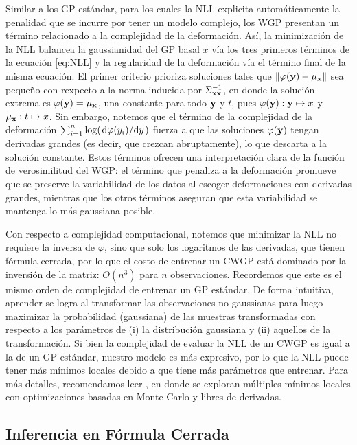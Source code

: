 Similar a los GP estándar, para los cuales la NLL explicita automáticamente la penalidad que se incurre por tener un modelo complejo, los WGP presentan un término relacionado a la complejidad de la deformación. Así, la minimización de la NLL balancea la gaussianidad del GP basal \(x\) vía los tres primeros términos de la ecuación \eqref{eq:NLL} y la regularidad de la deformación vía el término final de la misma ecuación. El primer criterio prioriza soluciones tales que \(\lVert \varphi(\mathbf{y}) - \mu_{\mathbf{x}} \rVert\) sea pequeño con rexpecto a la norma inducida por \(\Sigma_{\mathbf{x} \mathbf{x}}^{-1}\), en donde la solución extrema es \(\varphi(\mathbf{y}) = \mu_{\mathbf{x}}\), una constante para todo \(\mathbf{y}\) y \(t\), pues \(\varphi(\mathbf{y}) : \mathbf{y} \mapsto x\) y \(\mu_{\mathbf{x}} : t \mapsto x\). Sin embargo, notemos que el término de la complejidad de la deformación \(\sum_{i=1}^{n} \log(\dv*{\varphi(y_{i})}{y})\) fuerza a que las soluciones \(\varphi(\mathbf{y})\) tengan derivadas grandes (es decir, que crezcan abruptamente), lo que descarta a la solución constante. Estos términos ofrecen una interpretación clara de la función de verosimilitud del WGP: el término que penaliza a la deformación promueve que se preserve la variabilidad de los datos al escoger deformaciones con derivadas grandes, mientras que los otros términos aseguran que esta variabilidad se mantenga lo más gaussiana posible.

Con respecto a complejidad computacional, notemos que minimizar la NLL no requiere la inversa de \(\varphi\), sino que solo los logaritmos de las derivadas, que tienen fórmula cerrada, por lo que el costo de entrenar un CWGP está dominado por la inversión de la matriz: \(O(n^3)\) para \(n\) observaciones. Recordemos que este es el mismo orden de complejidad de entrenar un GP estándar. De forma intuitiva, aprender se logra al transformar las observaciones no gaussianas para luego maximizar la probabilidad (gaussiana) de las muestras transformadas con respecto a los parámetros de (i) la distribución gaussiana y (ii) aquellos de la transformación. Si bien la complejidad de evaluar la NLL de un CWGP es igual a la de un GP estándar, nuestro modelo es más expresivo, por lo que la NLL puede tener más mínimos locales debido a que tiene más parámetros que entrenar. Para más detalles, recomendamos leer \cite{rios2018learning}, en donde se exploran múltiples mínimos locales con optimizaciones basadas en Monte Carlo y libres de derivadas.

\subsection{Inferencia en Fórmula Cerrada}

